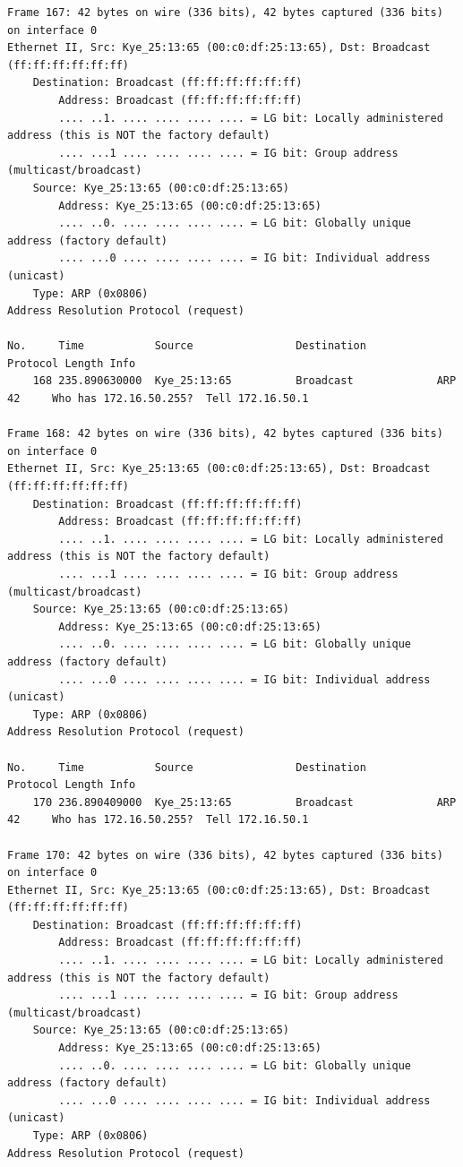 \documentclass[a4paper,11pt]{article}
\begin{document}
\begin{lstlisting}
Frame 167: 42 bytes on wire (336 bits), 42 bytes captured (336 bits) on interface 0
Ethernet II, Src: Kye_25:13:65 (00:c0:df:25:13:65), Dst: Broadcast (ff:ff:ff:ff:ff:ff)
    Destination: Broadcast (ff:ff:ff:ff:ff:ff)
        Address: Broadcast (ff:ff:ff:ff:ff:ff)
        .... ..1. .... .... .... .... = LG bit: Locally administered address (this is NOT the factory default)
        .... ...1 .... .... .... .... = IG bit: Group address (multicast/broadcast)
    Source: Kye_25:13:65 (00:c0:df:25:13:65)
        Address: Kye_25:13:65 (00:c0:df:25:13:65)
        .... ..0. .... .... .... .... = LG bit: Globally unique address (factory default)
        .... ...0 .... .... .... .... = IG bit: Individual address (unicast)
    Type: ARP (0x0806)
Address Resolution Protocol (request)

No.     Time           Source                Destination           Protocol Length Info
    168 235.890630000  Kye_25:13:65          Broadcast             ARP      42     Who has 172.16.50.255?  Tell 172.16.50.1

Frame 168: 42 bytes on wire (336 bits), 42 bytes captured (336 bits) on interface 0
Ethernet II, Src: Kye_25:13:65 (00:c0:df:25:13:65), Dst: Broadcast (ff:ff:ff:ff:ff:ff)
    Destination: Broadcast (ff:ff:ff:ff:ff:ff)
        Address: Broadcast (ff:ff:ff:ff:ff:ff)
        .... ..1. .... .... .... .... = LG bit: Locally administered address (this is NOT the factory default)
        .... ...1 .... .... .... .... = IG bit: Group address (multicast/broadcast)
    Source: Kye_25:13:65 (00:c0:df:25:13:65)
        Address: Kye_25:13:65 (00:c0:df:25:13:65)
        .... ..0. .... .... .... .... = LG bit: Globally unique address (factory default)
        .... ...0 .... .... .... .... = IG bit: Individual address (unicast)
    Type: ARP (0x0806)
Address Resolution Protocol (request)

No.     Time           Source                Destination           Protocol Length Info
    170 236.890409000  Kye_25:13:65          Broadcast             ARP      42     Who has 172.16.50.255?  Tell 172.16.50.1

Frame 170: 42 bytes on wire (336 bits), 42 bytes captured (336 bits) on interface 0
Ethernet II, Src: Kye_25:13:65 (00:c0:df:25:13:65), Dst: Broadcast (ff:ff:ff:ff:ff:ff)
    Destination: Broadcast (ff:ff:ff:ff:ff:ff)
        Address: Broadcast (ff:ff:ff:ff:ff:ff)
        .... ..1. .... .... .... .... = LG bit: Locally administered address (this is NOT the factory default)
        .... ...1 .... .... .... .... = IG bit: Group address (multicast/broadcast)
    Source: Kye_25:13:65 (00:c0:df:25:13:65)
        Address: Kye_25:13:65 (00:c0:df:25:13:65)
        .... ..0. .... .... .... .... = LG bit: Globally unique address (factory default)
        .... ...0 .... .... .... .... = IG bit: Individual address (unicast)
    Type: ARP (0x0806)
Address Resolution Protocol (request)


\end{lstlisting}
\end{document}
